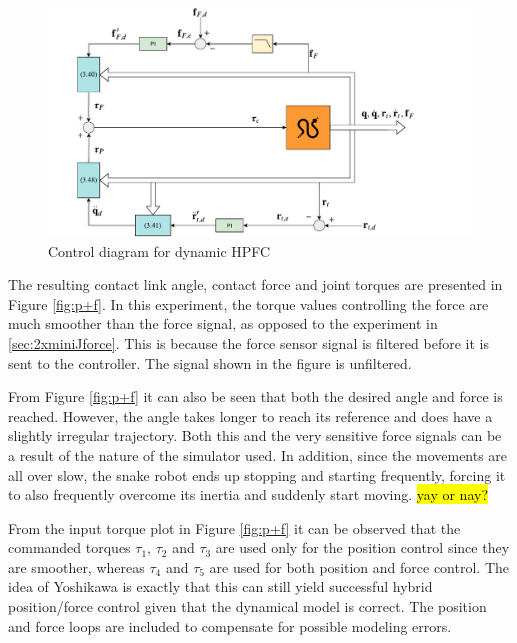 \begin{figure}
    \centering
    \includegraphics[trim=1cm 0cm 3cm 0cm, clip=true, width=\textwidth]{figures/experiments/control-diagrams/pf-control-diagram.pdf}
    \caption{Control diagram for dynamic HPFC}
    \label{fig:diag-pf}
\end{figure}

The resulting contact link angle, contact force and joint torques are presented in Figure \ref{fig:p+f}. In this experiment, the torque values controlling the force are much smoother than the force signal, as opposed to the experiment in \ref{sec:2xminiJforce}. This is because the force sensor signal is filtered before it is sent to the controller. The signal shown in the figure is unfiltered.

From Figure \ref{fig:p+f} it can also be seen that both the desired angle and force is reached. However, the angle takes longer to reach its reference and does have a slightly irregular trajectory. Both this and the very sensitive force signals can be a result of the nature of the simulator used. In addition, since the movements are all over slow, the snake robot ends up stopping and starting frequently, forcing it to also frequently overcome its inertia and suddenly start moving. \hl{yay or nay?}

From the input torque plot in Figure \ref{fig:p+f} it can be observed that the commanded torques $\tau_1$, $\tau_2$ and $\tau_3$ are used only for the position control since they are smoother, whereas $\tau_4$ and $\tau_5$ are used for both position and force control. The idea of Yoshikawa \cite{yoshikawa1987dynamic} is exactly that this can still yield successful hybrid position/force control given that the dynamical model is correct. The position and force loops are included to compensate for possible modeling errors.

